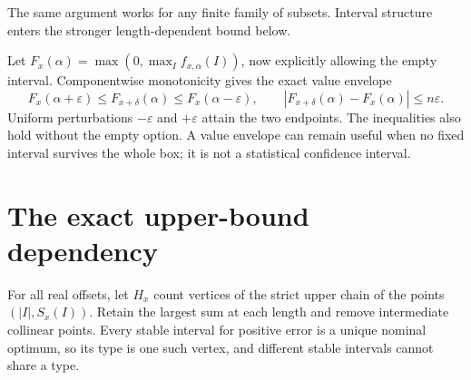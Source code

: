 The same argument works for any finite family of subsets. Interval structure enters the stronger length-dependent bound below.


Let $F_x(\alpha)=\max(0,\max_I f_{x,\alpha}(I))$, now explicitly allowing the empty interval. Componentwise monotonicity gives the exact value envelope
\begin{equation}\label{A-eq:value}
F_x(\alpha+\varepsilon)\le F_{x+\delta}(\alpha)\le F_x(\alpha-\varepsilon),
\qquad |F_{x+\delta}(\alpha)-F_x(\alpha)|\le n\varepsilon.
\end{equation}
Uniform perturbations $-\varepsilon$ and $+\varepsilon$ attain the two endpoints. The inequalities also hold without the empty option. A value envelope can remain useful when no fixed interval survives the whole box; it is not a statistical confidence interval.

\section{The exact upper-bound dependency}
For all real offsets, let $H_x$ count vertices of the strict upper chain of the points $(|I|,S_x(I))$. Retain the largest sum at each length and remove intermediate collinear points. Every stable interval for positive error is a unique nominal optimum, so its type is one such vertex, and different stable intervals cannot share a type.

